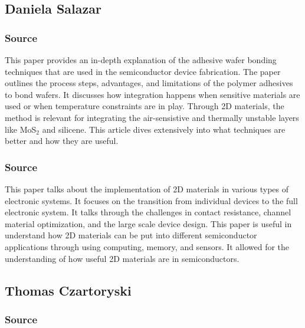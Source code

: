\documentclass[conference]{IEEEtran}
\begin{document}
\subsection{Daniela Salazar}

\subsubsection{Source \cite{ds1}}

This paper provides an in-depth explanation of the adhesive wafer bonding techniques that are used in the semiconductor device fabrication. The paper outlines the process steps, advantages, and limitations of the polymer adhesives to bond wafers. It discusses how integration happens when sensitive materials are used or when temperature constraints are in play. Through 2D materials, the method is relevant for integrating the air-sensistive and thermally unstable layers like MoS$_2$ and silicene. This article dives extensively into what techniques are better and how they are useful. 

\subsubsection{Source \cite{ds2}}

This paper talks about the implementation of 2D materials in various types of electronic systems. It focuses on the transition from individual devices to the full electronic system. It talks through the challenges in contact resistance, channel material optimization, and the large scale device design. This paper is useful in understand how 2D materials can be put into different semiconductor applications through using computing, memory, and sensors. It allowed for the understanding of how useful 2D materials are in semiconductors. 

\subsection{Thomas Czartoryski}

\subsubsection{Source \cite{tc6}}
\end{document}
